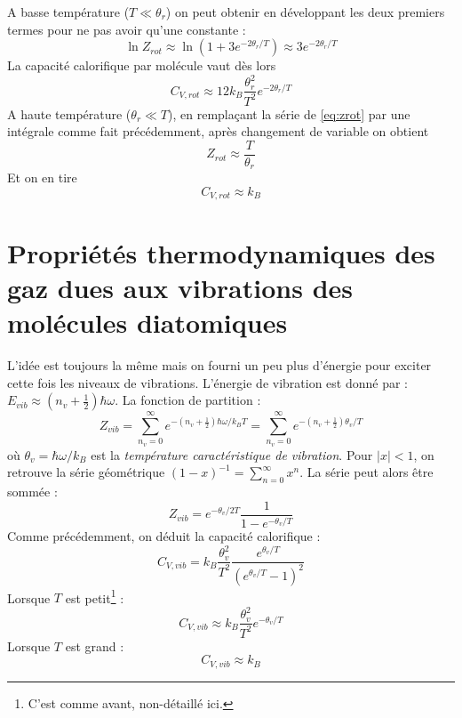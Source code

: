 \documentclass	[11pt, a4paper, openany]{book}
\begin{document}
		A basse température ($T \ll \theta_r$) on peut obtenir en développant les deux premiers
		termes pour ne pas avoir qu'une constante :
		\begin{equation}
			\ln Z_{rot} \approx \ln(1+3e^{-2\theta_r/T}) \approx 3e^{-2\theta_r/T}
		\end{equation}
		La capacité calorifique par molécule vaut dès lors
		\begin{equation}
			C_{V,rot} \approx 12 k_B \frac{\theta_r^2}{T^2}e^{-2\theta_r/T}
		\end{equation}
		A haute température ($\theta_r \ll T$), en remplaçant la série de \autoref{eq:zrot} par 
		une intégrale comme fait précédemment, après changement de variable on obtient
		\begin{equation}
			Z_{rot} \approx \frac{T}{\theta_r}
		\end{equation}
		Et on en tire
		\begin{equation}
			C_{V,rot} \approx k_B
		\end{equation}
		
		\section{Propriétés thermodynamiques des gaz dues aux vibrations des molécules 
		diatomiques}
		L'idée est toujours la même mais on fourni un peu plus d'énergie pour exciter cette fois
		les niveaux de vibrations. L'énergie de vibration est donné par : $E_{vib} \approx (n_v
		+\frac{1}{2} )\hbar\omega$. La fonction de partition :
		\begin{equation}
			Z_{vib} = \sum_{n_v=0}^\infty e^{-(n_v+\frac{1}{2})\hbar\omega/k_BT} = \sum_{n_v=0}^\infty
			e^{-(n_v+\frac{1}{2})\theta_v/T}
		\end{equation}
		où $\theta_v = \hbar\omega/k_B$ est la \textit{température caractéristique de vibration}.
		Pour $|x|<1$, on retrouve la série géométrique $(1-x)^{-1} = \sum_{n=0}^\infty x^n$. La 
		série peut alors être sommée : 
		\begin{equation}
			Z_{vib} = e^{-\theta_v/2T}\frac{1}{1-e^{-\theta_v/T}}
		\end{equation}
		Comme précédemment, on déduit la capacité calorifique :
		\begin{equation}
			C_{V,vib} = k_B \frac{\theta_v^2}{T^2}\frac{e^{\theta_v/T}}{(e^{\theta_v/T}-1)^2}
		\end{equation}
		Lorsque $T$ est petit\footnote{C'est comme avant, non-détaillé ici.} :
		\begin{equation}
			C_{V,vib} \approx k_B \frac{\theta_v^2}{T^2}e^{-\theta_v/T}
		\end{equation}
		Lorsque $T$ est grand :
		\begin{equation}
			C_{V,vib} \approx k_B
		\end{equation}
		
\end{document}
